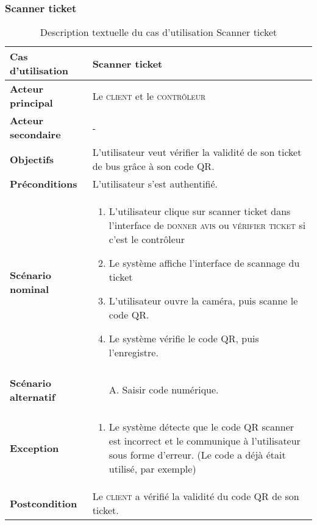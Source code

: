         \subsubsection[Scanner ticket]{Scanner ticket}
        \begin{longtable}{p{4cm} p{9cm}}
            \caption{Description textuelle du cas d’utilisation Scanner ticket}
            \label{table:usecaseScannerJ}
            \\\hline\hline
                \textbf{Cas d’utilisation} & \textbf{Scanner ticket}
            \\\hline\hline
                    \textbf{Acteur principal} & Le \textsc{client} et le \textsc{contrôleur}
                \\
                    \textbf{Acteur secondaire} & -
                \\
                    \textbf{Objectifs} & L’utilisateur veut vérifier la
                    validité de son ticket de bus grâce à son code QR.
                \\
                    \textbf{Préconditions} & L’utilisateur s’est authentifié.
                \\
                \textbf{Scénario nominal} &
                    \begin{enumerate}[leftmargin=*]
                        \item L’utilisateur clique sur scanner ticket dans
                        l’interface de \textsc{donner avis} ou \textsc{vérifier ticket} si c’est
                        le contrôleur
                        \item Le système affiche l’interface de scannage du ticket
                        \item L’utilisateur ouvre la caméra, puis scanne le code QR.
                        \item Le système vérifie le code QR, puis l’enregistre.
                    \end{enumerate}
                \\
                \textbf{Scénario alternatif} &
                    \begin{enumerate}[leftmargin=*]
                        \item [A.] Saisir code numérique.
                    \end{enumerate}
                \\
                \textbf{Exception} &
                \begin{enumerate}[leftmargin=*]
                        \item Le système détecte que le code QR scanner est incorrect et le communique à
                        l’utilisateur sous forme d’erreur.
                        (Le code a déjà était utilisé, par exemple)
                    \end{enumerate}
                \\
                \textbf{Postcondition} & Le \textsc{client} a vérifié la validité du code QR de son ticket.
            \\\bottomrule
        \end{longtable}

